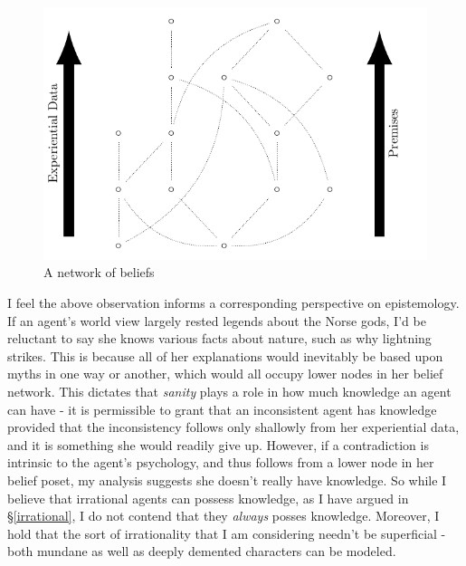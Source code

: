 \documentclass[11pt]{article}
\numberwithin{equation}{subsection}
\begin{document}
\begin{figure}[ht]
\begin{center}
\includegraphics[]{poset/poset2.pdf}
\end{center}
\caption{A network of beliefs}
\label{fig:poset}
\end{figure}

I feel the above observation informs a corresponding perspective on
epistemology.  If an agent's world view largely rested legends about
the Norse gods, I'd be reluctant to say she knows various facts about
nature, such as why lightning strikes.  This is because all of her
explanations would inevitably be based upon myths in one way or
another, which would all occupy lower nodes in her belief network.
This dictates that \emph{sanity} plays a role in how much knowledge an
agent can have - it is permissible to grant that an inconsistent agent
has knowledge provided that the inconsistency follows only shallowly
from her experiential data, and it is something she would readily give
up.  However, if a contradiction is intrinsic to the agent's
psychology, and thus follows from a lower node in her belief poset, my
analysis suggests she doesn't really have knowledge.  So while I
believe that irrational agents can possess knowledge, as I have argued
in \S\ref{irrational}, I do not contend that they \emph{always} posses
knowledge. Moreover, I hold that the sort of irrationality that I am
considering needn't be superficial - both mundane as well as deeply
demented characters can be modeled.
\end{document}
